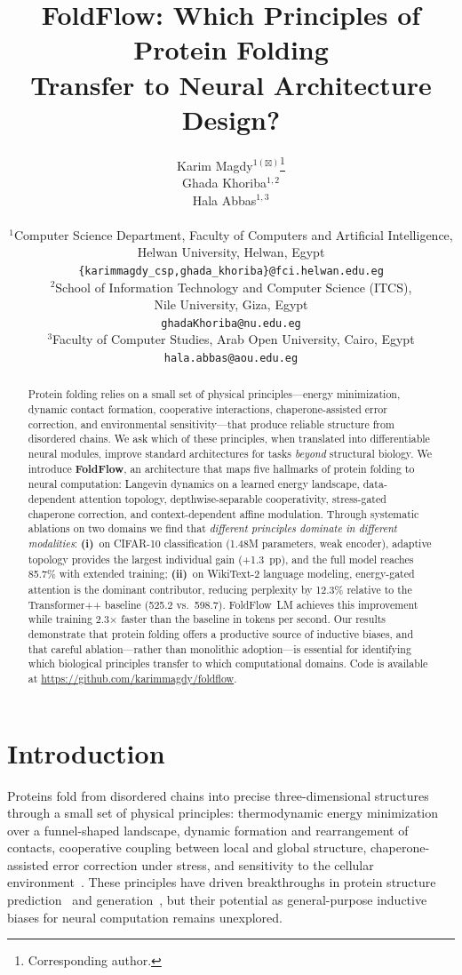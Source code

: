 \documentclass[10pt]{article}
\title{FoldFlow: Which Principles of Protein Folding\\Transfer to Neural Architecture Design?}
\author{
  Karim Magdy$^{1(\boxtimes)}$\thanks{Corresponding author.} \\
  \And
  Ghada Khoriba$^{1,2}$ \\
  \And
  Hala Abbas$^{1,3}$ \\
  \\
  $^1$Computer Science Department, Faculty of Computers and Artificial Intelligence, \\
  Helwan University, Helwan, Egypt \\
  \texttt{\{karimmagdy\_csp,ghada\_khoriba\}@fci.helwan.edu.eg} \\
  $^2$School of Information Technology and Computer Science (ITCS), \\
  Nile University, Giza, Egypt \\
  \texttt{ghadaKhoriba@nu.edu.eg} \\
  $^3$Faculty of Computer Studies, Arab Open University, Cairo, Egypt \\
  \texttt{hala.abbas@aou.edu.eg}
}
\begin{document}
\maketitle

\begin{abstract}
Protein folding relies on a small set of physical principles---energy
minimization, dynamic contact formation, cooperative interactions,
chaperone-assisted error correction, and environmental
sensitivity---that produce reliable structure from disordered chains.
We ask which of these principles, when translated into differentiable
neural modules, improve standard architectures for tasks \emph{beyond}
structural biology.  We introduce \textbf{FoldFlow}, an architecture
that maps five hallmarks of protein folding to neural computation:
Langevin dynamics on a learned energy landscape, data-dependent
attention topology, depthwise-separable cooperativity, stress-gated
chaperone correction, and context-dependent affine modulation.
Through systematic ablations on two domains we find that
\emph{different principles dominate in different modalities}:
\textbf{(i)}~on CIFAR-10 classification (1.48M parameters, weak
encoder), adaptive topology provides the largest individual gain
(+1.3~pp), and the full model reaches 85.7\% with extended training;
\textbf{(ii)}~on WikiText-2 language modeling, energy-gated attention
is the dominant contributor, reducing perplexity by 12.3\% relative to
the Transformer++ baseline (525.2 vs.\ 598.7).
FoldFlow~LM achieves this improvement while training 2.3$\times$ faster
than the baseline in tokens per second.  Our results demonstrate that
protein folding offers a productive source of inductive biases, and
that careful ablation---rather than monolithic adoption---is essential
for identifying which biological principles transfer to which
computational domains.
Code is available at \url{https://github.com/karimmagdy/foldflow}.
\end{abstract}

\section{Introduction}
\label{sec:intro}

Proteins fold from disordered chains into precise three-dimensional
structures through a small set of physical principles: thermodynamic
energy minimization over a funnel-shaped landscape, dynamic formation
and rearrangement of contacts, cooperative coupling between local and
global structure, chaperone-assisted error correction under stress, and
sensitivity to the cellular environment~\citep{anfinsen1973, dill2012protein}.
These principles have driven breakthroughs in protein structure
prediction~\citep{jumper2021alphafold, baek2021accurate, lin2023evolutionary}
and generation~\citep{bose2024se3stochastic}, but their potential as
general-purpose inductive biases for neural computation remains unexplored.
\end{document}
